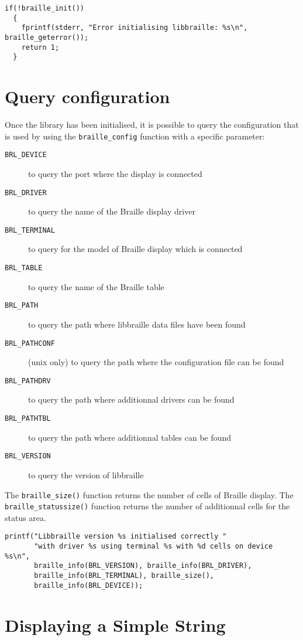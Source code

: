 \documentclass[12pt,a4paper]{article}
\begin{document}
\begin{verbatim}
if(!braille_init())
  {
    fprintf(stderr, "Error initialising libbraille: %s\n", braille_geterror());
    return 1;
  }
\end{verbatim}   

\section{Query configuration}

Once the library has been initialised, it is possible to query the
configuration that is used by using the {\tt braille\_config} function
with a specific parameter:
\begin{description}
\item[{\tt BRL\_DEVICE}] to query the port where the display is connected
\item[{\tt BRL\_DRIVER}] to query the name of the Braille display driver
\item[{\tt BRL\_TERMINAL}] to query for the model of Braille display
which is connected
\item[{\tt BRL\_TABLE}] to query the name of the Braille table
\item[{\tt BRL\_PATH}] to query the path where libbraille data files
have been found
\item[{\tt BRL\_PATHCONF}] (unix only) to query the path where the
  configuration file can be found
\item[{\tt BRL\_PATHDRV}] to query the path where additionnal
  drivers can be found
\item[{\tt BRL\_PATHTBL}] to query the path where additionnal
  tables can be found
\item[{\tt BRL\_VERSION}] to query the version of libbraille
\end{description}

The {\tt braille\_size()} function returns the number of cells of
Braille display. The {\tt braille\_statussize()} function returns the
number of additionnal cells for the status area.

\begin{verbatim}
printf("Libbraille version %s initialised correctly "
       "with driver %s using terminal %s with %d cells on device %s\n",
       braille_info(BRL_VERSION), braille_info(BRL_DRIVER),
       braille_info(BRL_TERMINAL), braille_size(),
       braille_info(BRL_DEVICE));
\end{verbatim}

\section{Displaying a Simple String}
\end{document}
